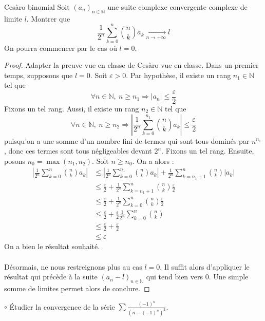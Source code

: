 \documentclass[french,a4paper]{article}
\newcommand{\N}{\mathbb{N}}
\theoremstyle{plain}
\theoremstyle{definition}
\theoremstyle{remark}
\begin{document}
\begin{ex}{Cesàro binomial}
	Soit $(a_n)_{n \in\N}$ une suite complexe convergente complexe de limite $l$. Montrer que $$\frac{1}{2^n}\sum_{k=0}^{n}\binom{n}{k}a_k \xrightarrow[n\to+\infty]{}l $$ On pourra commencer par le cas où $l=0$.
\end{ex}
\begin{proof}
	Adapter la preuve vue en classe de Cesàro vue en classe. Dans un premier temps, supposons que $l=0$. Soit $\varepsilon>0$. Par hypothèse, il existe un rang $n_1 \in \N$ tel que $$\forall n \in \N, \ n \geqslant n_1 \Longrightarrow \lvert a_n\rvert\leqslant\frac\varepsilon2$$ Fixons un tel rang. Aussi, il existe un rang $n_2 \in \N$ tel que $$\forall n \in \N, \ n \geqslant n_2 \Longrightarrow\left\lvert\frac{1}{2^n}\sum_{k=0}^{n_1}\binom{n}{k}a_k\right\rvert\leqslant\frac\varepsilon2$$ puisqu'on a une somme d'un nombre fini de termes qui sont tous dominés par $n^{n_1}$, donc ces termes sont tous négligeables devant $2^n$. Fixons un tel rang. Ensuite, posons $n_0=\max(n_1, n_2)$. Soit $n\geqslant n_0$. On a alors :
	\begin{align*}
		\left\lvert\frac{1}{2^n}\sum_{k=0}^{n}\binom{n}{k}a_k\right\rvert &\leqslant \left\lvert\frac{1}{2^n}\sum_{k=0}^{n_1}\binom{n}{k}a_k\right\rvert + \frac{1}{2^n}\sum_{k=n_1+1}^{n}\binom{n}{k}\lvert a_k\rvert\\
		& \leqslant \frac\varepsilon2 + \frac{1}{2^n}\sum_{k=n_1+1}^{n}\binom{n}{k}\frac\varepsilon2 \\
		& \leqslant \frac\varepsilon2 + \frac{1}{2^n}\sum_{k=0}^{n}\binom{n}{k}\frac\varepsilon2 \\
		& \leqslant \frac\varepsilon2 + \frac\varepsilon2 \frac{1}{2^n}\sum_{k=0}^{n}\binom{n}{k} \\
		& \leqslant \frac\varepsilon2 + \frac\varepsilon2 \\
		& \leqslant \varepsilon
	\end{align*}
	On a bien le résultat souhaité. \\ \\ Désormais, ne nous restreignons plus au cas $l=0$. Il suffit alors d'appliquer le résultat qui précède à la suite $(a_n-l)_{n \in \N}$ qui tend bien vers 0. Une simple somme de limites permet alors de conclure.
\end{proof}

\begin{ex}{$\circ$}
	Étudier la convergence de la série $\displaystyle\sum\frac{(-1)^n}{\left(n-(-1)^n\right)^2}$.
\end{ex}
\end{document}
